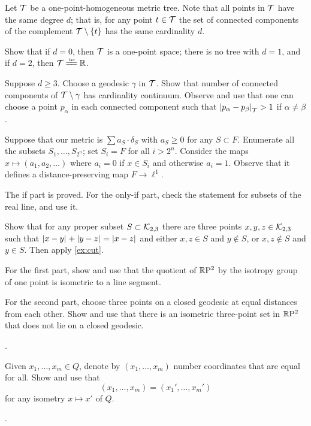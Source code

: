 Let $\mathcal{T}$ be a one-point-homogeneous metric tree.
Note that all points in $\mathcal{T}$ have the same degree $d$;
that is, for any point $t\in \mathcal{T}$ the set of connected components of the complement $\mathcal{T}\setminus\{t\}$ has the same cardinality $d$.

Show that if $d=0$, then $\mathcal{T}$ is a one-point space;
there is no tree with $d=1$,
and if $d=2$, then $\spc{T}\iso\RR$.

Suppose $d\ge 3$.
Choose a geodesic $\gamma$ in $\mathcal{T}$.
Show that number of connected components of $\mathcal{T}\setminus\gamma$ has cardinality continuum.
Observe and use that one can choose a point $p_\alpha$ in each connected component such that $\dist{p_\alpha}{p_\beta}{\spc{T}}>1$ if $\alpha\ne\beta$.

Suppose that our metric is $\sum a_S\cdot\delta_S$ with $a_S\ge 0$ for any $S\subset F$.
Enumerate all the subsets $S_1,\dots,S_{2^n}$;
set $S_i=F$ for all $i>2^n$. 
Consider the maps $x\mapsto (a_1,a_2,\dots)$ where $a_i=0$ if $x\in S_i$ and otherwise $a_i=1$.
Observe that it defines a distance-preserving map $F\to \ell^1$. 

The if part is proved.
For the only-if part, check the statement for subsets of the real line, and use it.

Show that for any proper subset $S\subset \mathcal{K}_{2,3}$ there are three points $x,y,z\in \mathcal{K}_{2,3}$ such that $\dist{x}{y}{} +\dist{y}{z}{}=\dist{x}{z}{}$ and either 
$x,z\in S$ and $y\notin S$, or $x,z\notin S$ and $y\in S$.
Then apply \ref{ex:cut}.

For the first part, show and use that the quotient of $\mathbb{R}\mathrm{P}^2$ by the isotropy group of one point is isometric to a line segment.

For the second part, choose three points on a closed geodesic at equal distances from each other.
Show and use that there is an isometric three-point set in $\mathbb{R}\mathrm{P}^2$ that does not lie on a closed geodesic.

 \cite[V \S 2]{busemann-1942}.

Given $x_1,\dots,x_m\in Q$, denote by $(x_1,\dots,x_m)$ number coordinates that are equal for all.
Show and use that 
\[(x_1,\dots,x_m)=(x_1',\dots,x_m')\]
for any isometry $x\mapsto x'$ of $Q$.

 \cite[prop. 6 and 7]{berestovskii-nikonorov}.
